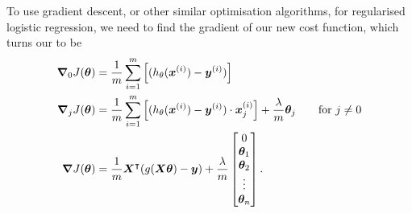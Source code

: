 To use gradient descent, or other similar optimisation algorithms, for regularised logistic regression, we need to find the gradient of our new cost function, which
turns our to be
\begin{align}
    \bm{\nabla}_0 J(\bm{\theta}) &= \frac{1}{m} \sum_{i=1}^{m}\left[(h_{\theta}(\bm{x}^{(i)})-\bm{y}^{(i)})\right] \\
    \bm{\nabla}_j J(\bm{\theta}) &= \frac{1}{m} \sum_{i=1}^{m}\left[(h_{\theta}(\bm{x}^{(i)})-\bm{y}^{(i)})\cdot\bm{x}^{(i)}_j\right] + \frac{\lambda}{m}\bm{\theta}_j \quad\quad \textrm{for } j \ne 0 \\
    \bm{\nabla} J(\bm{\theta}) &= \frac{1}{m} \bm{X}^{\intercal}(g(\bm{X\theta}) - \bm{y}) + \frac{\lambda}{m}\begin{bmatrix}
        0 \\ \bm{\theta}_1 \\ \bm{\theta}_2 \\ \vdots \\ \bm{\theta}_n
    \end{bmatrix}.
\end{align}

